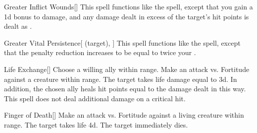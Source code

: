 \lowercase{\hypertarget{spell:Greater Inflict Wounds}{}}\label{spell:Greater Inflict Wounds}
\begin{apability}[\nth{3}]{\hypertarget{spell:Greater Inflict Wounds}{Greater Inflict Wounds}}[]
This spell functions like the  spell, except that you gain a \plus1d bonus to damage, and any damage dealt in excess of the target's hit points is dealt as .
\end{apability}
\vspace{0.25em}



\lowercase{\hypertarget{spell:Greater Vital Persistence}{}}\label{spell:Greater Vital Persistence}
\begin{attuneability}[\nth{4}]{\hypertarget{spell:Greater Vital Persistence}{Greater Vital Persistence}}[ (target), ]
This spell functions like the  spell, except that the penalty reduction increases to be equal to twice your .
\end{attuneability}
\vspace{0.25em}



\lowercase{\hypertarget{spell:Life Exchange}{}}\label{spell:Life Exchange}
\begin{apability}[\nth{4}]{\hypertarget{spell:Life Exchange}{Life Exchange}}[]
Choose a willing ally within \rngmed range.
Make an attack vs. Fortitude against a creature within \rngmed range.
\hit The target takes life damage equal to  \plus3d.
In addition, the chosen ally heals hit points equal to the damage dealt in this way.
\crit This spell does not deal additional damage on a critical hit.
\end{apability}
\vspace{0.25em}



\lowercase{\hypertarget{spell:Finger of Death}{}}\label{spell:Finger of Death}
\begin{apability}[\nth{5}]{\hypertarget{spell:Finger of Death}{Finger of Death}}[]
Make an attack vs. Fortitude against a living creature within \rngclose range.
\hit The target takes life  \plus4d.
\crit The target immediately dies.
\end{apability}
\vspace{0.25em}



